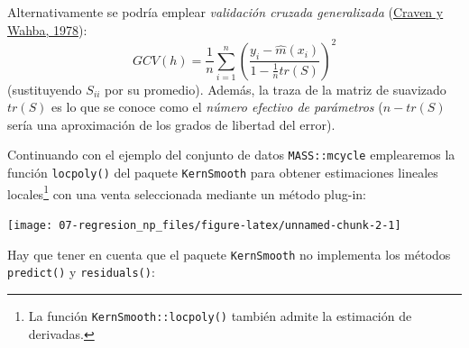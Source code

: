 \documentclass[
  spanish,
]{book}
\newenvironment{Shaded}{\begin{snugshade}}{\end{snugshade}}
\newcommand{\AttributeTok}[1]{\textcolor[rgb]{0.77,0.63,0.00}{#1}}
\newcommand{\CommentTok}[1]{\textcolor[rgb]{0.56,0.35,0.01}{\textit{#1}}}
\newcommand{\FunctionTok}[1]{\textcolor[rgb]{0.00,0.00,0.00}{#1}}
\newcommand{\NormalTok}[1]{#1}
\newcommand{\OtherTok}[1]{\textcolor[rgb]{0.56,0.35,0.01}{#1}}
\newcommand{\SpecialCharTok}[1]{\textcolor[rgb]{0.00,0.00,0.00}{#1}}
\newcommand{\StringTok}[1]{\textcolor[rgb]{0.31,0.60,0.02}{#1}}
\theoremstyle{break}
\theoremstyle{definition}
\theoremstyle{definition}
\theoremstyle{definition}
\theoremstyle{definition}
\theoremstyle{remark}
\begin{document}
Alternativamente se podría emplear \emph{validación cruzada generalizada} (\protect\hyperlink{ref-craven1978smoothing}{Craven y Wahba, 1978}):
\[GCV(h)=\frac{1}{n}\sum_{i=1}^n\left(\frac{y_i-\hat{m}(x_i)}{1 - \frac{1}{n}tr(S)}\right)^2\]
(sustituyendo \(S_{ii}\) por su promedio).
Además, la traza de la matriz de suavizado \(tr(S)\) es lo que se conoce como el \emph{número efectivo de parámetros} (\(n - tr(S)\) sería una aproximación de los grados de libertad del error).

Continuando con el ejemplo del conjunto de datos \texttt{MASS::mcycle} emplearemos la función \texttt{locpoly()} del paquete \texttt{KernSmooth} para obtener estimaciones lineales locales\footnote{La función \texttt{KernSmooth::locpoly()} también admite la estimación de derivadas.} con una venta seleccionada mediante un método plug-in:

\begin{Shaded}
\end{Shaded}

\begin{center}\texttt{[image: 07-regresion\_np\_files/figure-latex/unnamed-chunk-2-1]} \end{center}

Hay que tener en cuenta que el paquete \texttt{KernSmooth} no implementa los métodos
\texttt{predict()} y \texttt{residuals()}:

\begin{Shaded}
\end{Shaded}
\end{document}
